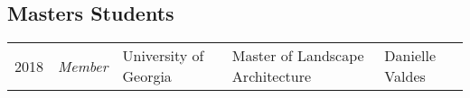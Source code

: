 \subsection{Masters Students}
\begin{tabularx}{\linewidth}{llXXX}
2018 & \textit{Member} & University of Georgia & Master of Landscape Architecture & Danielle Valdes\\
\end{tabularx}